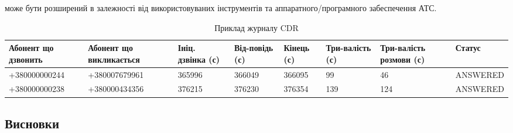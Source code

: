   може бути розширений в залежності від використовуваних інструментів та аппаратного/програмного забеспечення АТС.

  \begin{table}[h]
  \footnotesize
  \caption{Приклад журналу CDR}
        \begin{tabularx}{\textwidth}{| X | X | X | X | X | X | X | X |}
          \hline
          Абонент що дзвонить & Абонент що викликається & Ініц. дзвінка (с) & Від-повідь (с) & Кінець (с) & Три-валість (с) & Три-валість розмови (с) & Статус \\ \hline
          \scriptsize{+380000000244} & \scriptsize{+380007679961} & 365996 & 366049 & 366095 & 99 & 46 & \scriptsize{ANSWERED} \\ \hline
          \scriptsize{+380000000238} & \scriptsize{+380000434356} & 376215 & 376230 & 376354 & 139 & 124 & \scriptsize{ANSWERED}  \\ \hline
      \end{tabularx}
      \label{tab:cdr-log-example}
  \end{table}

\newpage
\subsection*{Висновки}
    \TBD

